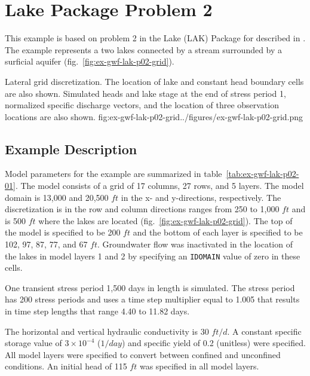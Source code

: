 \section{Lake Package Problem 2}

This example is based on problem 2 in the Lake (LAK) Package for \mftk described in \cite{modflowlak3pack}. The example represents a two lakes connected by a stream surrounded by a surficial aquifer (fig.~\ref{fig:ex-gwf-lak-p02-grid}).                                

\begin{StandardFigure}{
                                     Lateral grid discretization. The location of lake and constant head boundary
                                     cells are also shown. Simulated heads and lake stage at the end of stress 
                                     period 1, normalized specific discharge vectors, and the location of three 
                                     observation locations are also shown.
                                     }{fig:ex-gwf-lak-p02-grid}{../figures/ex-gwf-lak-p02-grid.png}
\end{StandardFigure}   


\subsection{Example Description}
Model parameters for the example are summarized in table~\ref{tab:ex-gwf-lak-p02-01}.  The model consists of a grid of 17 columns, 27 rows, and 5 layers. The model domain is 13,000 and 20,500 $ft$ in the x- and y-directions, respectively. The discretization is in the row and column directions ranges from 250 to 1,000 $ft$ and is 500 $ft$ where the lakes are located (fig.~\ref{fig:ex-gwf-lak-p02-grid}). The top of the model is specified to be 200 $ft$ and the bottom of each layer is specified to be 102, 97, 87, 77, and 67 $ft$. Groundwater flow was inactivated in the location of the lakes in model layers 1 and 2 by specifying an \texttt{IDOMAIN} value of zero in these cells.

One transient stress period 1,500 days in length is simulated. The stress period has 200 stress periods and uses a time step multiplier equal to 1.005 that results in time step lengths that range 4.40 to 11.82 days.



The horizontal and vertical hydraulic conductivity is 30 $ft/d$. A constant specific storage value of $3 \times 10^{-4}$ ($1/day$) and specific yield of 0.2 (unitless) were specified. All model layers were specified to convert between confined and unconfined conditions. An initial head of 115 $ft$ was specified in all model layers.

